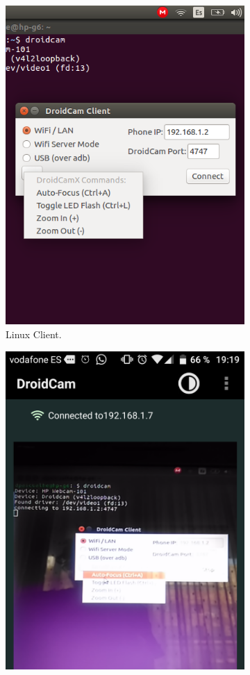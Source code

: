 \begin{figure}
\begin{subfigure}{0.33\textwidth}
		\includegraphics[width=0.9\linewidth]{figures/droidcamlinux.png}
		\caption{Linux Client.}
		\label{fig:droidlinux}
	\end{subfigure}%
	\begin{subfigure}{0.33\textwidth}
		\centering
		\includegraphics[width=0.9\linewidth]{figures/droidcampost.png}

\end{subfigure}
\end{figure}
